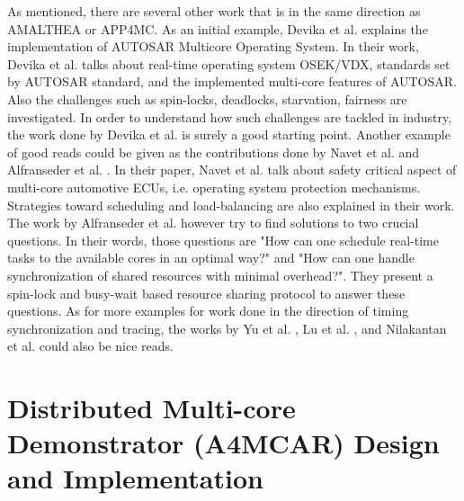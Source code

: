 As mentioned, there are several other work that is in the same direction as AMALTHEA or APP4MC. As an initial example, Devika et al. \cite{autosarospaper1} explains the implementation of AUTOSAR Multicore Operating System. In their work, Devika et al. talks about real-time operating system OSEK/VDX, standards set by AUTOSAR standard, and the implemented multi-core features of AUTOSAR. Also the challenges such as spin-locks, deadlocks, starvation, fairness are investigated. In order to understand how such challenges are tackled in industry, the work done by Devika et al. is surely a good starting point. Another example of good reads could be given as the contributions done by Navet et al. \cite{paper2} and Alfranseder et al. \cite{paper3}. In their paper, Navet et al. talk about safety critical aspect of multi-core automotive ECUs, i.e. operating system protection mechanisms. Strategies toward scheduling and load-balancing are also explained in their work. The work by Alfranseder et al. \cite{paper3} however try to find solutions to two crucial questions. In their words, those questions are "How can one schedule real-time tasks to the available cores in an optimal way?" and "How can one handle synchronization of shared resources with minimal overhead?". They present a spin-lock and busy-wait based resource sharing protocol to answer these questions. As for more examples for work done in the direction of timing synchronization and tracing, the works by Yu et al. \cite{paper4}, Lu et al. \cite{paper5}, and Nilakantan et al. \cite{paper6} could also be nice reads.

\chapter{Distributed Multi-core Demonstrator (A4MCAR) Design and Implementation} \label{designchapter}
